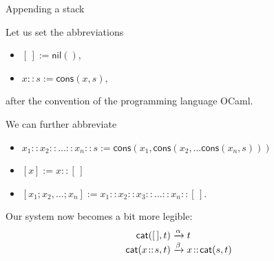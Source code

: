 \documentclass[compress,dvipdfmx]{beamer}
\newcommand{\OCaml}{\textsf{OCaml}\xspace}
\newcommand\fun[1]{\textsf{#1}}
\newcommand\el{[\,]}
\newcommand\cons[2]{{#1}\!::\!{#2}}
\begin{document}
%
\begin{frame}{Appending a stack}

  Let us set the abbreviations
  \begin{itemize}

    \item \(\el := \fun{nil}()\),

    \item \(\cons{x}{s} := \fun{cons}(x,s)\),

  \end{itemize}
  after the convention of the programming language \OCaml.

  \bigskip

  We can further abbreviate
  \begin{itemize}

    \item \(\cons{x_1}{\cons{x_2}{\cons{\dots}{\cons{x_n}{s}}}} :=
      \fun{cons}(x_1, \fun{cons}(x_2, \dots \fun{cons}(x_n,s)))\)

    \item \([x] := \cons{x}{\el}\)

    \item \([x_1; x_2, \dots; x_n] :=
          \cons{x_1}{\cons{x_2}{\cons{x_3}{\cons{\ldots}{\cons{x_n}{\el}}}}}\).

  \end{itemize}

  Our system now becomes a bit more legible:
  \begin{align*}
    \fun{cat}(        \el,t) &\xrightarrow{\alpha} t\\
    \fun{cat}(\cons{x}{s},t) &\xrightarrow{\smash{\beta}}
    \cons{x}{\fun{cat}(s,t)}
  \end{align*}

\end{frame}
\end{document}

